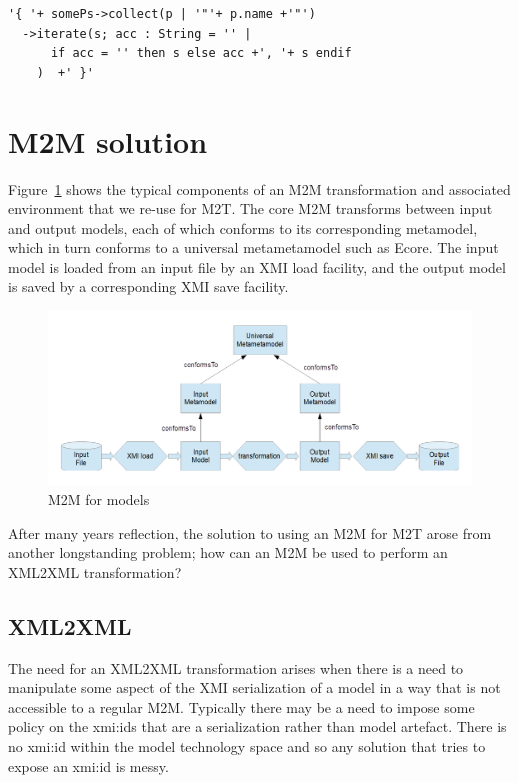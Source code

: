 \documentclass{llncs}
\begin{document}
\begin{verbatim}
'{ '+ somePs->collect(p | '"'+ p.name +'"')
  ->iterate(s; acc : String = '' |
      if acc = '' then s else acc +', '+ s endif
    )  +' }'
\end{verbatim}

\section{M2M solution}\label{M2M}

Figure~\ref{fig:ModelM2M} shows the typical components of an M2M transformation and associated environment that we re-use for M2T. The core M2M transforms between input and output models, each of which conforms to its corresponding metamodel, which in turn conforms to a universal metametamodel such as Ecore. The input model is loaded from an input file by an XMI load facility, and the output model is saved by a corresponding XMI save facility.

\begin{figure}
	\begin{center}
		\includegraphics[width=4.9in]{ModelM2M.png}
	\end{center}
	\caption{M2M for models}
	\label{fig:ModelM2M}
\end{figure}

After many years reflection, the solution to using an M2M for M2T arose from another longstanding problem; how can an M2M be used to perform an XML2XML transformation?

\subsection{XML2XML}\label{XML2XML}

The need for an XML2XML transformation arises when there is a need to manipulate some aspect of the XMI serialization of a model in a way that is not accessible to a regular M2M. Typically there may be a need to impose some policy on the xmi:ids that are a serialization rather than model artefact. There is no xmi:id within the model technology space and so any solution that tries to expose an xmi:id is messy.
\end{document}

